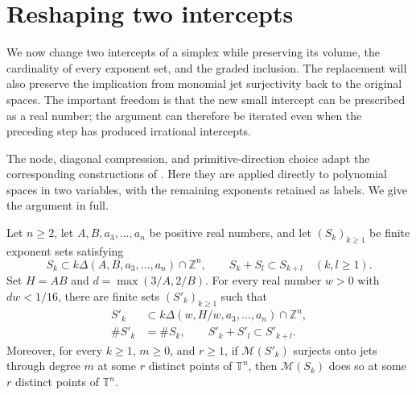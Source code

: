 \section{Reshaping two intercepts}\label{sec:reshaping}

We now change two intercepts of a simplex while preserving its volume, the cardinality of every exponent set, and the graded inclusion.  The replacement will also preserve the implication from monomial jet surjectivity back to the original spaces.  The important freedom is that the new small intercept can be prescribed as a real number; the argument can therefore be iterated even when the preceding step has produced irrational intercepts.

The node, diagonal compression, and primitive-direction choice adapt the corresponding constructions of \textcite[Propositions~3.2 and~3.4 and Lemma~4.3]{OpenAI2026Surfaces}. Here they are applied directly to polynomial spaces in two variables, with the remaining exponents retained as labels.  We give the argument in full.

\begin{proposition}\label{prop:reshape}
Let $n\ge2$, let $A,B,a_3,\ldots,a_n$ be positive real numbers, and let $(S_k)_{k\ge1}$ be finite exponent sets satisfying
\[
 S_k\subset k\Delta(A,B,a_3,\ldots,a_n)\cap\mathbb{Z}^n,
 \qquad S_k+S_l\subset S_{k+l}\quad(k,l\ge1).
\]
Set $H=AB$ and $d=\max(3/A,2/B)$.  For every real number $w>0$ with $dw<1/16$, there are finite sets $(S'_k)_{k\ge1}$ such that
\begin{align}
 S'_k&\subset k\Delta(w,H/w,a_3,\ldots,a_n)\cap\mathbb{Z}^n,
                                                        \label{eq:reshape-bound}\\
 \#S'_k&=\#S_k,
 \qquad S'_k+S'_l\subset S'_{k+l}.                       \label{eq:reshape-graded}
\end{align}
Moreover, for every $k\ge1$, $m\ge0$, and $r\ge1$, if $\mathcal{M}(S'_k)$ surjects onto jets through degree $m$ at some $r$ distinct points of $\mathbb{T}^n$, then $\mathcal{M}(S_k)$ does so at some $r$ distinct points of $\mathbb{T}^n$.
\end{proposition}



